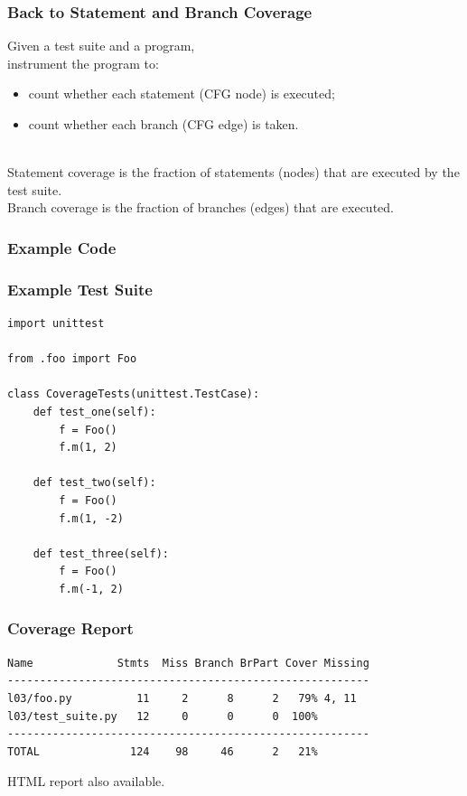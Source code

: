 \documentclass{beamer}
\newenvironment{changemargin}[1]{%
  \begin{list}{}{%
    \setlength{\topsep}{0pt}%
    \setlength{\leftmargin}{#1}%
    \setlength{\rightmargin}{1em}
    \setlength{\listparindent}{\parindent}%
    \setlength{\itemindent}{\parindent}%
    \setlength{\parsep}{\parskip}%
  }%
  \item[]}{\end{list}}
\begin{document}
\begin{frame}
  \frametitle{Back to Statement and Branch Coverage}

  \begin{changemargin}{2em}
    Given a test suite and a program,\\
    instrument the program to:
    \begin{itemize}
    \item count whether each statement (CFG node) is executed;
    \item count whether each branch (CFG edge) is taken.
    \end{itemize}
    ~\\
  
\alert{Statement coverage} is the fraction of statements (nodes) that are
executed by the test suite. \\[1em]
\alert{Branch coverage} is the fraction of branches (edges)
that are executed.
  \end{changemargin}
\end{frame}

\begin{frame}
  \frametitle{Example Code}
  
\end{frame}

\begin{frame}[fragile]
  \frametitle{Example Test Suite}
  \begin{lstlisting}
import unittest

from .foo import Foo

class CoverageTests(unittest.TestCase):
    def test_one(self):
        f = Foo()
        f.m(1, 2)

    def test_two(self):
        f = Foo()
        f.m(1, -2)

    def test_three(self):
        f = Foo()
        f.m(-1, 2)
  \end{lstlisting}
\end{frame}

\begin{frame}[fragile]
  \frametitle{Coverage Report}

  \begin{lstlisting}
Name             Stmts  Miss Branch BrPart Cover Missing
--------------------------------------------------------
l03/foo.py          11     2      8      2   79% 4, 11
l03/test_suite.py   12     0      0      0  100%
--------------------------------------------------------
TOTAL              124    98     46      2   21%
  \end{lstlisting}

\hspace*{2em}  HTML report also available.
  
\end{frame}
\end{document}
